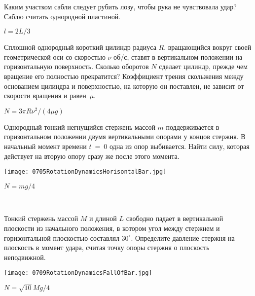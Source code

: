 \begin{ex}
Каким участком сабли следует рубить лозу, чтобы рука не чувствовала удар? Саблю считать однородной пластиной.
\begin{ans}
$l=2L/3$
\end{ans}
\end{ex}

\begin{ex}
Сплошной однородный короткий цилиндр радиуса $R$, вращающийся вокруг своей геометрической оси со скоростью $\nu$ об/с, ставят в вертикальном положении на горизонтальную поверхность. Сколько оборотов $N$ сделает цилиндр, прежде чем вращение его полностью прекратится? Коэффициент трения скольжения между основанием цилиндра и поверхностью, на которую он поставлен, не зависит от скорости вращения и равен~$\mu$.
\begin{ans}
$N=3 \pi R \nu^2/(4\mu g)$
\end{ans}
\end{ex}

\begin{ex}
Однородный тонкий негнущийся стержень массой $m$ поддерживается в горизонтальном положении двумя вертикальными опорами у концов стержня. В начальный момент времени $t~=~0$ одна из опор выбивается. Найти силу, которая действует на вторую опору сразу же после этого момента.
\begin{center}
\texttt{[image: 0705RotationDynamicsHorisontalBar.jpg]}
\end{center}
\begin{ans}
$N = mg/4$
\end{ans}
\end{ex}

\begin{ex}
\hspace{0pt} \\
\begin{minipage}{.65\textwidth}
Тонкий стержень массой $M$ и длиной $L$ свободно падает в вертикальной плоскости из начального положения, в котором угол между стержнем и горизонтальной плоскостью составлял $30^{\circ}$. Определите давление стержня на плоскость в момент удара, считая точку опоры стержня о плоскость неподвижной.
\end{minipage}
\begin{minipage}{.35\textwidth}
\centering
\texttt{[image: 0709RotationDynamicsFallOfBar.jpg]}
\end{minipage}
\begin{ans}
$N=\sqrt{10}Mg/4$
\end{ans}
\end{ex}

